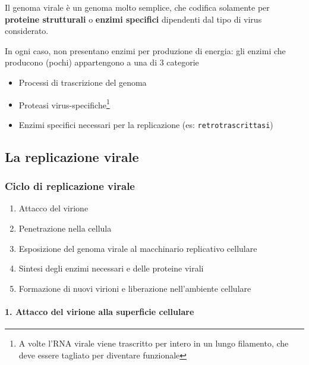 \documentclass[italian,]{article}
\providecommand{\tightlist}{%
  \setlength{\itemsep}{0pt}\setlength{\parskip}{0pt}}
\newcommand{\normalbox}[2]{\begin{tcolorbox}[title=#1]#2\end{tcolorbox}} %
\begin{document}
\normalbox{Enzimi virus-specifici}{
Il genoma virale è un genoma molto semplice, che codifica solamente per
\textbf{proteine strutturali} o \textbf{enzimi specifici} dipendenti dal
tipo di virus considerato.

In ogni caso, non presentano enzimi per produzione di energia: gli
enzimi che producono (pochi) appartengono a una di 3 categorie

\begin{itemize}
\tightlist
\item
  Processi di trascrizione del genoma
\item
  Proteasi virus-specifiche\footnote{A volte l'RNA virale viene
    trascritto per intero in un lungo filamento, che deve essere
    tagliato per diventare funzionale}
\item
  Enzimi specifici necessari per la replicazione (es:
  \texttt{retrotrascrittasi})
\end{itemize}
}

\hypertarget{la-replicazione-virale}{%
\subsection{La replicazione virale}\label{la-replicazione-virale}}

\hypertarget{ciclo-di-replicazione-virale}{%
\subsubsection{Ciclo di replicazione
virale}\label{ciclo-di-replicazione-virale}}

\begin{enumerate}
\def\labelenumi{\arabic{enumi}.}
\tightlist
\item
  Attacco del virione
\item
  Penetrazione nella cellula
\item
  Esposizione del genoma virale al macchinario replicativo cellulare
\item
  Sintesi degli enzimi necessari e delle proteine virali
\item
  Formazione di nuovi virioni e liberazione nell'ambiente cellulare
\end{enumerate}

\hypertarget{attacco-del-virione-alla-superficie-cellulare}{%
\paragraph{1. Attacco del virione alla superficie
cellulare}\label{attacco-del-virione-alla-superficie-cellulare}}
\end{document}
